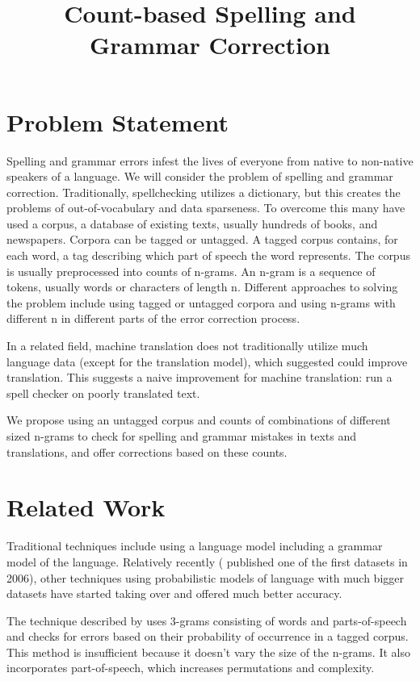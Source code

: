\documentclass[twocolumn]{article}
\title{Count-based Spelling and Grammar Correction\vspace{-7ex}}
\date{}
\begin{document}
%
%


\maketitle

\section{Problem Statement}
Spelling and grammar errors infest the lives of everyone from native to non-native speakers of a language. We will consider the problem of spelling and grammar correction. Traditionally, spellchecking utilizes a dictionary, but this creates the problems of out-of-vocabulary and data sparseness. To overcome this many have used a corpus, a database of existing texts, usually hundreds of books, and newspapers. Corpora can be tagged or untagged. A tagged corpus contains, for each word, a tag describing which part of speech the word represents. The corpus is usually preprocessed into counts of n-grams. An n-gram is a sequence of tokens, usually words or characters of length n. Different approaches to solving the problem include using tagged or untagged corpora and using n-grams with different n in different parts of the error correction process.

In a related field, machine translation does not traditionally utilize much language data (except for the translation model), which \cite{norvig09} suggested could improve translation. This suggests a naive improvement for machine translation: run a spell checker on poorly translated text.

We propose using an untagged corpus and counts of combinations of different sized n-grams to check for spelling and grammar mistakes in texts and translations, and offer corrections based on these counts.

\section{Related Work}
Traditional techniques include using a language model including a grammar model of the language. Relatively recently (\cite{michel11} published one of the first datasets in 2006), other techniques using probabilistic models of language with much bigger datasets have started taking over and offered much better accuracy.

The technique described by \cite{Fossati07} uses 3-grams consisting of words and parts-of-speech and checks for errors based on their probability of occurrence in a tagged corpus. This method is insufficient because it doesn’t vary the size of the n-grams. It also incorporates part-of-speech, which increases permutations and complexity.
\end{document}
